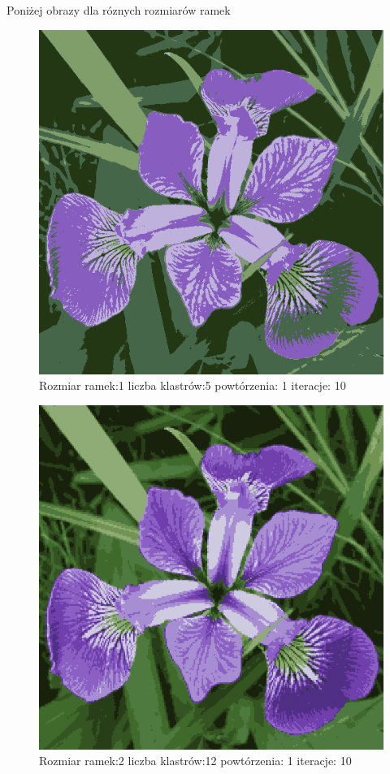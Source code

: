 \documentclass{classrep}
\begin{document}
{{{{Poniżej obrazy dla róznych rozmiarów ramek
\begin{figure}[!htbp]
\centering
\includegraphics[width=\textwidth,width=90mm]{obrazy/iris_R1_K5_P1_It10.png}
\caption{Rozmiar ramek:1 liczba klastrów:5 powtórzenia: 1 iteracje: 10 }
\end{figure}

\begin{figure}[!htbp]
\centering
\includegraphics[width=\textwidth,width=90mm]{obrazy/iris_R2_K12_P1_It10.png}
\caption{Rozmiar ramek:2 liczba klastrów:12 powtórzenia: 1 iteracje: 10 }
\end{figure}

}}}}
\end{document}
